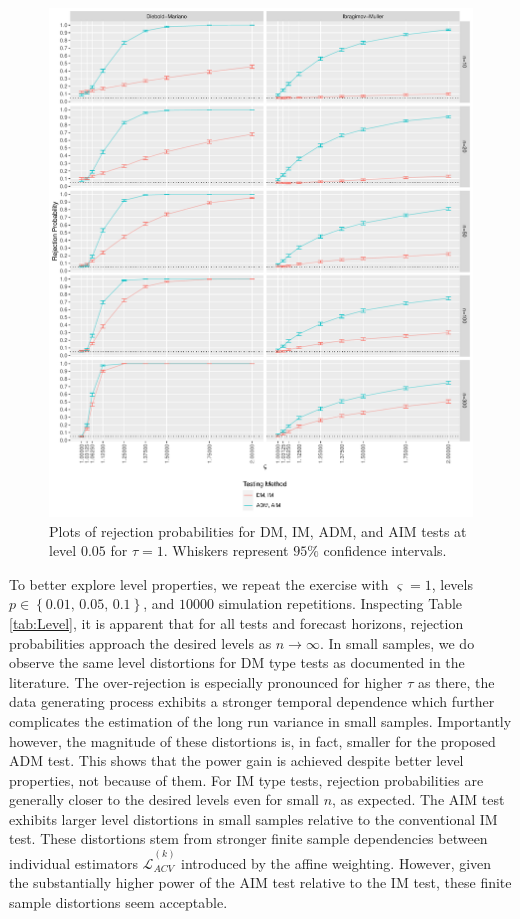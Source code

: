 \documentclass[11pt,dvipsnames]{article}
\begin{document}
\begin{figure}[!htbp]
\centering
\includegraphics[width=.9\linewidth]{../../Scripts/Power/Outputs/Power_h=1_Article.pdf}
\caption{Plots of rejection probabilities for DM, IM, ADM, and AIM tests at level $ 0.05 $ for $ \tau=1 $. Whiskers represent $ 95\% $ confidence intervals.
}
\label{fig:Power_1} 
\end{figure}

To better explore level properties, we repeat the exercise with $ \varsigma=1  $, levels $ p\in\left\lbrace 0.01,\,0.05,\,0.1 \right\rbrace $, and $ 10000 $ simulation repetitions. Inspecting Table \ref{tab:Level}, it is apparent that for all tests and forecast horizons, rejection probabilities approach the desired levels as $ n \rightarrow \infty $. In small samples, we do observe the same level distortions for DM type tests as documented in the literature. The over-rejection is especially pronounced for higher $ \tau $ as there, the data generating process exhibits a stronger temporal dependence which further complicates the estimation of the long run variance in small samples. Importantly however, the magnitude of these distortions is, in fact, smaller for the proposed ADM test. This shows that the power gain is achieved despite better level properties, not because of them. For IM type tests, rejection probabilities are generally closer to the desired levels even for small $ n $, as expected. The AIM test exhibits larger level distortions in small samples relative to the conventional IM test. These distortions stem from stronger finite sample dependencies between individual estimators $ \widehat{\mathcal{L}}_{ACV}^{(k)} $ introduced by the affine weighting. However, given the substantially higher power of the AIM test relative to the IM test, these finite sample distortions seem acceptable. 
\end{document}
